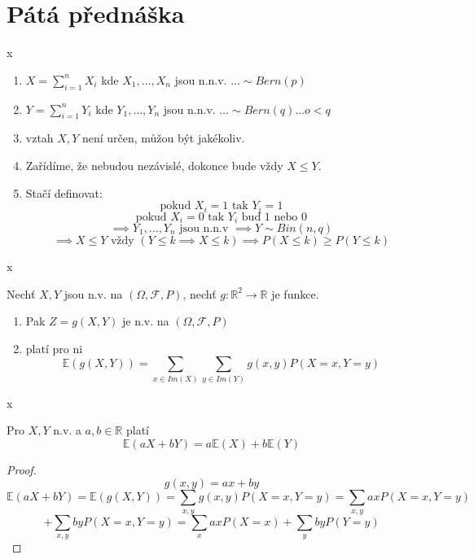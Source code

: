\documentclass[../main.tex]{subfiles}
\begin{document}
\section{Pátá přednáška}

\begin{definition}[Coupling]
    {\color{white} x}

    \begin{enumerate}
        \item $X = \sum^n_{i=1} X_i$ kde $X_1,\dots , X_n$ jsou n.n.v. $\dots \sim Bern(p)$
        \item $Y = \sum^n_{i=1} Y_i$ kde $Y_1,\dots , Y_n$ jsou n.n.v. $\dots \sim Bern(q) \dots o < q$
        \item vztah $X,Y$ není určen, můžou být jakékoliv.
        \item Zařídíme, že nebudou nezávislé, dokonce bude vždy $X \leq Y$.
        \item Stačí definovat:
        \[\text{pokud } X_i = 1 \text{ tak } Y_i = 1\]
        \[\text{pokud } X_i = 0 \text{ tak } Y_i \text{ buď } 1 \text{ nebo }0\]
        \[\implies Y_1,\dots,Y_n \text{ jsou n.n.v } \implies Y \sim Bin(n,q)\]
        \[\implies X \leq Y \text{ vždy } (Y \leq k \implies X\leq k) \implies P(X\leq k) \geq P(Y\leq k)\]
    \end{enumerate}
\end{definition}

\begin{theorem}
    {\color{white} x}

    Nechť $X,Y$ jsou n.v. na $(\Omega,\mathcal{F},P)$, nechť $g:\mathbb{R}^2 \rightarrow \mathbb{R}$ je funkce.
    \begin{enumerate}
        \item Pak $Z = g(X,Y)$ je n.v. na $(\Omega,\mathcal{F},P)$
        \item platí pro ni
        \[\mathbb{E}(g(X,Y)) = \sum_{x\in Im(X)} \sum_{y\in Im(Y)} g(x,y)P(X=x,Y=y)\]
    \end{enumerate}
\end{theorem}
\begin{theorem}
    {\color{white} x}

    Pro $X,Y$ n.v. a $a,b \in \mathbb{R}$ platí
    \[\mathbb{E}(aX+bY) = a\mathbb{E}(X)+b\mathbb{E}(Y)\]
\end{theorem}
\begin{proof}
    \[g(x,y) = ax+by\]
    \[\mathbb{E}(aX+bY) = \mathbb{E}(g(X,Y)) = \sum_{x,y} g(x,y) P(X=x,Y=y) = \sum_{x,y} axP(X=x,Y=y)\]
    \[+ \sum_{x,y}byP(X=x,Y=y) = \sum_{x}axP(X=x) + \sum_y byP(Y=y)\]
\end{proof}
\end{document}
